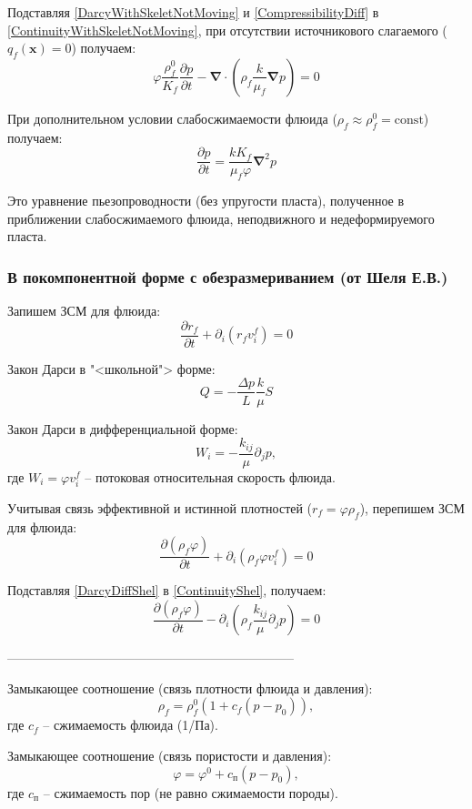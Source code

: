 \documentclass[a4paper,12pt]{article}
\newcommand{\beq}{\begin{equation}}
\newcommand{\eeq}{\end{equation}}
\begin{document}
Подставляя \eqref{DarcyWithSkeletNotMoving} и \eqref{CompressibilityDiff} в \eqref{ContinuityWithSkeletNotMoving}, при отсутствии источникового слагаемого ($q_f(\pmb{x})=0$) получаем:
\beq
\varphi\frac{\rho_f^0}{K_f}\frac{\partial p}{\partial t}-\pmb{\nabla}\cdot\left(\rho_f\frac{k}{\mu_f}\pmb{\nabla} p\right)=0
\eeq

При дополнительном условии слабосжимаемости флюида ($\rho_f\approx\rho_f^0=\textrm{const}$) получаем:
\beq
\frac{\partial p}{\partial t}=\frac{kK_f}{\mu_f\varphi}\pmb{\nabla}^2p
\eeq

Это уравнение пьезопроводности (без упругости пласта), полученное в приближении слабосжимаемого флюида, неподвижного и недеформируемого пласта.

\subsubsection{В покомпонентной форме с обезразмериванием (от Шеля Е.В.)}

Запишем ЗСМ для флюида:
\beq
\frac{\partial r_f}{\partial t}+\partial_i\left(r_f v_i^f\right)=0
\eeq

Закон Дарси в "<школьной"> форме:
\beq
Q=-\frac{\Delta p}{L}\frac{k}{\mu}S
\eeq

Закон Дарси в дифференциальной форме:
\beq\label{DarcyDiffShel}
W_i=-\frac{k_{ij}}{\mu}\partial_j p,
\eeq
где $W_i=\varphi v_i^f$ -- потоковая относительная скорость флюида.

Учитывая связь эффективной и истинной плотностей ($r_f=\varphi\rho_f$), перепишем ЗСМ для флюида:
\beq\label{ContinuityShel}
\frac{\partial\left(\rho_f\varphi\right)}{\partial t}+\partial_i\left(\rho_f\varphi v_i^f\right)=0
\eeq

Подставляя \eqref{DarcyDiffShel} в \eqref{ContinuityShel}, получаем:
\beq\label{GeneralPiezo}
\frac{\partial\left(\rho_f\varphi\right)}{\partial t}-\partial_i\left(\rho_f\frac{k_{ij}}{\mu}\partial_j p\right)=0
\eeq

--------------------------------------------------------------------

Замыкающее соотношение (связь плотности флюида и давления):
\beq\label{Zam1}
\rho_f=\rho_f^0\left(1+c_f\left(p-p_0\right)\right),
\eeq
где $c_f$ -- сжимаемость флюида (1/Па).


Замыкающее соотношение (связь пористости и давления):
\beq\label{Zam2}
\varphi=\varphi^0+c_{\text{п}}\left(p-p_0\right),
\eeq
где $c_{\text{п}}$ -- сжимаемость пор (не равно сжимаемости породы).
\end{document}

